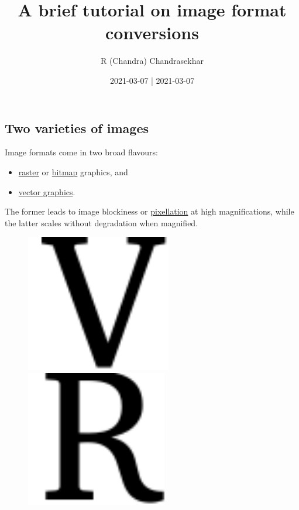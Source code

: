 \documentclass[
  11pt,
  british,
  a4paper,
]{article}
\title{A brief tutorial on image format conversions}
\author{R (Chandra) Chandrasekhar}
\date{2021-03-07 | 2021-03-07}
\providecommand{\tightlist}{%
  \setlength{\itemsep}{0pt}\setlength{\parskip}{0pt}}
\begin{document}
\maketitle

\thispagestyle{empty}


\hypertarget{two-varieties-of-images}{%
\subsection{Two varieties of images}\label{two-varieties-of-images}}

Image formats come in two broad flavours:

\begin{itemize}
\tightlist
\item
  \href{https://en.wikipedia.org/wiki/Raster_graphics}{raster} or
  \href{https://en.wikipedia.org/wiki/Bitmap}{bitmap} graphics, and
\item
  \href{https://en.wikipedia.org/wiki/Vector_graphics}{vector graphics}.
\end{itemize}

The former leads to image blockiness or
\href{https://en.wikipedia.org/wiki/Pixelation}{pixellation} at high
magnifications, while the latter scales without degradation when
magnified.

\begin{figure}[h]
  \begin{minipage}[b]{0.5\textwidth}
    \centering
    \includegraphics[height=60mm]{images/vector.pdf}
  \end{minipage}\hfill
  \begin{minipage}[b]{0.5\textwidth}
    \centering
    \includegraphics[height=60mm]{images/raster-zoom.png}
  \end{minipage}
\end{figure}
\end{document}
